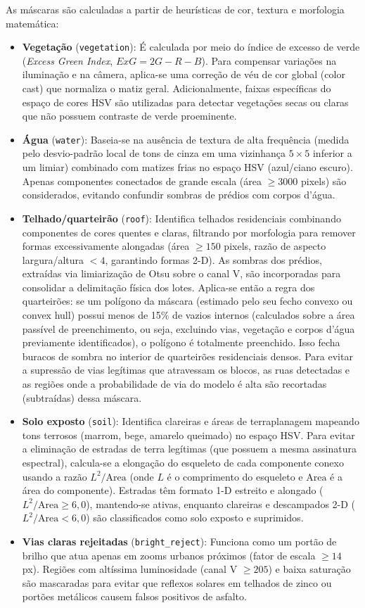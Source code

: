 \documentclass[12pt]{article}
\begin{document}
As máscaras são calculadas a partir de heurísticas de cor, textura e morfologia matemática:
\begin{itemize}
    \item \textbf{Vegetação} (\texttt{vegetation}): É calculada por meio do índice de excesso de verde (\textit{Excess Green Index}, $ExG = 2G - R - B$). Para compensar variações na iluminação e na câmera, aplica-se uma correção de véu de cor global (color cast) que normaliza o matiz geral. Adicionalmente, faixas específicas do espaço de cores HSV são utilizadas para detectar vegetações secas ou claras que não possuem contraste de verde proeminente.
    \item \textbf{Água} (\texttt{water}): Baseia-se na ausência de textura de alta frequência (medida pelo desvio-padrão local de tons de cinza em uma vizinhança $5\times5$ inferior a um limiar) combinado com matizes frias no espaço HSV (azul/ciano escuro). Apenas componentes conectados de grande escala (área $\ge 3000$ pixels) são considerados, evitando confundir sombras de prédios com corpos d'água.
    \item \textbf{Telhado/quarteirão} (\texttt{roof}): Identifica telhados residenciais combinando componentes de cores quentes e claras, filtrando por morfologia para remover formas excessivamente alongadas (área $\ge 150$ pixels, razão de aspecto largura/altura $< 4$, garantindo formas 2-D). As sombras dos prédios, extraídas via limiarização de Otsu sobre o canal V, são incorporadas para consolidar a delimitação física dos lotes. Aplica-se então a regra dos quarteirões: se um polígono da máscara (estimado pelo seu fecho convexo ou convex hull) possui menos de 15\% de vazios internos (calculados sobre a área passível de preenchimento, ou seja, excluindo vias, vegetação e corpos d'água previamente identificados), o polígono é totalmente preenchido. Isso fecha buracos de sombra no interior de quarteirões residenciais densos. Para evitar a supressão de vias legítimas que atravessam os blocos, as ruas detectadas e as regiões onde a probabilidade de via do modelo é alta são recortadas (subtraídas) dessa máscara.
    \item \textbf{Solo exposto} (\texttt{soil}): Identifica clareiras e áreas de terraplanagem mapeando tons terrosos (marrom, bege, amarelo queimado) no espaço HSV. Para evitar a eliminação de estradas de terra legítimas (que possuem a mesma assinatura espectral), calcula-se a elongação do esqueleto de cada componente conexo usando a razão $L^2/\text{Area}$ (onde $L$ é o comprimento do esqueleto e $\text{Area}$ é a área do componente). Estradas têm formato 1-D estreito e alongado ($L^2/\text{Area} \ge 6{,}0$), mantendo-se ativas, enquanto clareiras e descampados 2-D ($L^2/\text{Area} < 6{,}0$) são classificados como solo exposto e suprimidos.
    \item \textbf{Vias claras rejeitadas} (\texttt{bright\_reject}): Funciona como um portão de brilho que atua apenas em zooms urbanos próximos (fator de escala $\ge 14$\,px). Regiões com altíssima luminosidade (canal V $\ge 205$) e baixa saturação são mascaradas para evitar que reflexos solares em telhados de zinco ou portões metálicos causem falsos positivos de asfalto.
\end{itemize}
\end{document}
